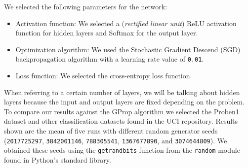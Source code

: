 \documentclass[runningheads]{llncs}
\begin{document}
We selected the following parameters for the network:

\begin{itemize}
\item Activation function: We selected a (\emph{rectified linear unit}) ReLU 
      activation function for hidden layers and Softmax for the output layer.
\item Optimization algorithm: We used the Stochastic Gradient Descend 
      (SGD) backpropagation algorithm with a learning rate value of \texttt{0.01}.
\item Loss function: We selected the cross-entropy loss function.
\end{itemize}

When referring to a certain number of layers, we will be talking about hidden
layers because the input and output layers are fixed depending on the problem.
To compare our results against the GProp algorithm we selected the Proben1
\cite{Proben1} dataset and other classification datasets found in the UCI
\cite{uci} repository. Results shown are the mean of five runs with different
random generator seeds (\texttt{2017725297}, \texttt{3842001146},
\texttt{788305541}, \texttt{1367677890}, and \texttt{3074644809}). We obtained
these seeds using the \texttt{getrandbits} function from the \texttt{random}
module found in Python's standard library.




\end{document}
